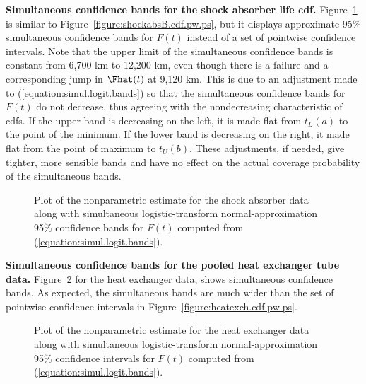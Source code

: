 \begin{example}
{\bf Simultaneous confidence bands for the shock absorber life cdf.}
Figure~\ref{figure:shockabsB.cdf.sim.ps} is similar to
Figure~\ref{figure:shockabsB.cdf.pw.ps}, but it displays approximate
95\% simultaneous confidence bands for $F(t)$ instead of a set of
pointwise confidence intervals.  Note that the upper limit of the
simultaneous confidence bands is constant from 6,700 km to 12,200 km,
even though there is a failure and a corresponding jump in $\Fhat(t)$
at 9,120 km.  This is due to an adjustment made to
(\ref{equation:simul.logit.bands}) so that the simultaneous confidence
bands for $F(t)$ do not decrease, thus agreeing with the
nondecreasing characteristic of cdfs. If the upper band is
decreasing on the left, it is made flat from $t_{L}(a)$ to the point
of the minimum. If the lower band is decreasing on the right, it made
flat from the point of maximum to $t_{U}(b)$.  These adjustments, if
needed, give tighter, more sensible bands and have no effect on the
actual coverage probability of the simultaneous bands.
\begin{figure}
\caption{Plot of the nonparametric estimate
for the shock absorber data along with simultaneous logistic-transform
normal-approximation 95\% confidence bands for $F(t)$ computed from
(\ref{equation:simul.logit.bands}).}
\label{figure:shockabsB.cdf.sim.ps}
\end{figure}
\end{example}



\begin{example}
{\bf Simultaneous confidence bands for the pooled heat exchanger tube data.}
Figure~\ref{figure:heatexch.cdf.sim.ps} for the
heat exchanger data, shows simultaneous confidence
bands. As expected, the simultaneous bands are much wider than the
set of pointwise confidence intervals in 
Figure~\ref{figure:heatexch.cdf.pw.ps}.
\begin{figure}
\caption{Plot of the nonparametric estimate
for the heat exchanger data along with simultaneous logistic-transform
normal-approximation 95\% confidence intervals for $F(t)$ computed from
(\ref{equation:simul.logit.bands}).}
\label{figure:heatexch.cdf.sim.ps}
\end{figure}
\end{example}

